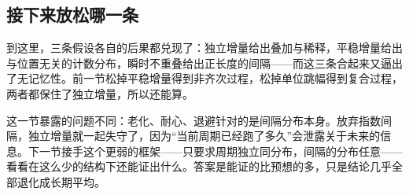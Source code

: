 \subsection{接下来放松哪一条}

到这里，三条假设各自的后果都兑现了：独立增量给出叠加与稀释，平稳增量给出与位置无关的计数分布，瞬时不重叠给出正长度的间隔——而这三条合起来又逼出了无记忆性。前一节松掉平稳增量得到非齐次过程，松掉单位跳幅得到复合过程，两者都保住了独立增量，所以还能算。

这一节暴露的问题不同：老化、耐心、退避针对的是间隔分布本身。放弃指数间隔，独立增量就一起失守了，因为``当前周期已经跑了多久''会泄露关于未来的信息。下一节接手这个更弱的框架——只要求周期独立同分布，间隔的分布任意——看看在这么少的结构下还能证出什么。答案是能证的比预想的多，只是结论几乎全部退化成长期平均。

